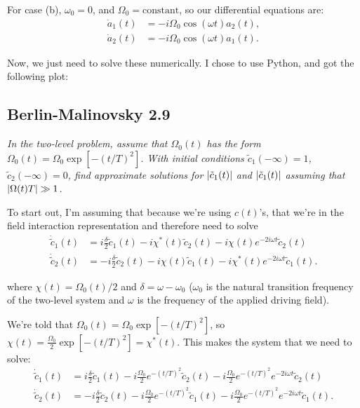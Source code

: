 For case (b), $\omega_{0}=0$, and $\Omega_{0}=\text{constant}$, so our differential equations are:
\begin{align*}
  \dot a_{1}(t) &= -i \Omega_{0}\cos{(\omega t)}a_{2}(t), \\
  \dot a_{2}(t) &= -i\Omega_{0} \cos{(\omega t)} a_{1}(t).
\end{align*}

Now, we just need to solve these numerically. I chose to use Python, and got the following plot:
\vspace{1em}

\subsection{Berlin-Malinovsky 2.9}
\textit{In the two-level problem, assume that $\Omega_{0}(t)$ has the form $\Omega_{0}(t)=\Omega_{0}\exp[-(t/T)^2]$. With initial conditions $\tilde c_{1}(-\infty)=1$, $\tilde c_{2}(-\infty)=0$, find approximate solutions for $\abs{\tilde c_{1}(t)}$ and $\abs{\tilde c_{1}(t)}$ assuming that $\abs{\Omega(t)T}\gg 1$.}
\vspace{1em}

To start out, I'm assuming that because we're using $c(t)$'s, that we're in the field interaction representation and therefore need to solve
\begin{align*}
  \dot \tilde c_{1}(t) &= i \frac{\delta}{2} \tilde c_{1}(t) - i \chi^{*}(t) \tilde c_{2}(t) - i \chi(t) e^{-2i\omega t} \tilde c_{2}(t) \\
  \dot \tilde c_{2}(t) &= -i \frac{\delta}{2} \tilde c_{2}(t) - i\chi(t)\tilde c_{1}(t) - i \chi^{*}(t)e^{-2i\omega t} \tilde c_{1}(t).
\end{align*}

where $\chi(t)=\Omega_{0}(t)/2$ and $\delta=\omega-\omega_{0}$ ($\omega_{0}$ is the natural transition frequency of the two-level system and $\omega$ is the frequency of the applied driving field).
\vspace{1em}

We're told that $\Omega_{0}(t) = \Omega_{0}\exp [-(t/T)^{2}]$, so $\chi(t) = \frac{\Omega_{0}}{2} \exp [-(t/T)^{2}] = \chi^{*}(t)$. This makes the system that we need to solve:
\begin{align*}
  \dot \tilde c_{1}(t) &= i \frac{\delta}{2} \tilde c_{1}(t) - i \frac{\Omega_{0}}{2} e^{-(t/T)^{2}}  \tilde c_{2}(t) - i \frac{\Omega_{0}}{2} e^{-(t/T)^{2}} e^{-2i\omega t} \tilde c_{2}(t) \\
  \dot \tilde c_{2}(t) &= -i \frac{\delta}{2} \tilde c_{2}(t) - i\frac{\Omega_{0}}{2} e^{-(t/T)^{2}}\tilde c_{1}(t) - i \frac{\Omega_{0}}{2} e^{-(t/T)^{2}}e^{-2i\omega t} \tilde c_{1}(t).
\end{align*}

